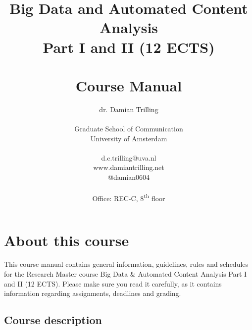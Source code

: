 \documentclass[a4paper,10pt,twocolumn]{report}
\title{Big Data and Automated Content Analysis\\ Part I and II (12 ECTS)\\~\\Course Manual}
\author{dr. Damian Trilling\\~\\Graduate School of Communication\\University of Amsterdam\\~\\d.c.trilling@uva.nl \\www.damiantrilling.net \\@damian0604 \\~\\Office: REC-C, 8\textsuperscript{th} floor}
\date{Academic Year 2020/21\\Semester 2, block 1 and 2\\ 
\begin{corona} Coronavirus-Pandemic Online Edition\end{corona}
}
\begin{document}
\maketitle



\chapter{About this course}

This course manual contains general information, guidelines, rules and schedules for the Research Master course Big Data \& Automated Content Analysis Part I and II (12 ECTS). Please make sure you read it carefully, as it  contains information regarding assignments, deadlines and grading.

\section{Course description}


\end{document}

